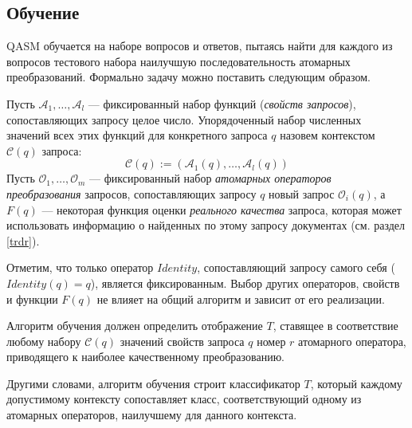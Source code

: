 \documentclass{article}
\begin{document}
\subsection{Обучение}\label{qasm:learning}

QASM обучается на наборе вопросов и ответов,
пытаясь найти для каждого из вопросов тестового набора наилучшую последовательность
атомарных преобразований. Формально задачу можно поставить следующим образом.

Пусть $\mathcal{A}_1,\ldots, \mathcal{A}_l$ --- фиксированный набор 
функций ({\em свойств запросов}), сопоставляющих запросу целое число.
Упорядоченный набор численных значений всех этих функций для конкретного
запроса $q$ назовем контекстом $\mathcal{C}(q)$ запроса:
$$\mathcal{C}(q):=(\mathcal{A}_1(q),\ldots,\mathcal{A}_l(q))$$
Пусть $\mathcal{O}_1,\ldots, \mathcal{O}_m$ --- 
фиксированный набор {\em атомарных операторов преобразования} запросов,
сопоставляющих запросу $q$ новый запрос $\mathcal{O}_i(q)$, 
а $F(q)$ --- некоторая функция оценки {\em реального качества} запроса, которая может 
использовать информацию о найденных по этому запросу документах (см. раздел \ref{trdr}).

Отметим, что только оператор $Identity$, сопоставляющий запросу самого себя
($Identity(q)=q$), является фиксированным. Выбор других операторов, свойств и
функции $F(q)$ не влияет на общий алгоритм и зависит от его 
реализации.

Алгоритм обучения должен определить отображение $T$,
ставящее в соответствие любому набору
$\mathcal{C}(q)$ значений
свойств запроса $q$ номер $r$ атомарного оператора, 
приводящего к наиболее качественному преобразованию.

Другими словами, алгоритм обучения строит классификатор $T$,
который каждому допустимому контексту сопоставляет
класс, соответствующий одному из атомарных операторов, наилучшему для данного контекста.



\end{document}
